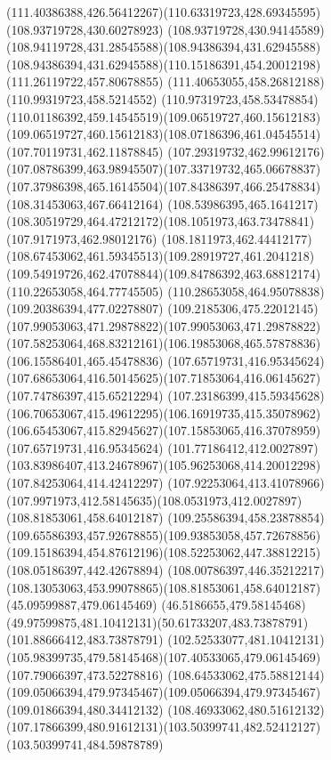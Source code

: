 {{\curveto(111.40386388,426.56412267)(110.63319723,428.69345595)(108.93719728,430.60278923)
\curveto(108.93719728,430.94145589)(108.94119728,431.28545588)(108.94386394,431.62945588)
\curveto(108.94386394,431.62945588)(110.15186391,454.20012198)(111.26119722,457.80678855)
\lineto(111.40653055,458.26812188)
\lineto(110.99319723,458.5214552)
\curveto(110.97319723,458.53478854)(110.01186392,459.14545519)(109.06519727,460.15612183)
\curveto(109.06519727,460.15612183)(108.07186396,461.04545514)(107.70119731,462.11878845)
\curveto(107.29319732,462.99612176)(107.08786399,463.98945507)(107.33719732,465.06678837)
\curveto(107.37986398,465.16145504)(107.84386397,466.25478834)(108.31453063,467.66412164)
\lineto(108.53986395,465.1641217)
\curveto(108.30519729,464.47212172)(108.1051973,463.73478841)(107.9171973,462.98012176)
\curveto(108.1811973,462.44412177)(108.67453062,461.59345513)(109.28919727,461.2041218)
\curveto(109.54919726,462.47078844)(109.84786392,463.68812174)(110.22653058,464.77745505)
\lineto(110.28653058,464.95078838)
\lineto(109.20386394,477.02278807)
\curveto(109.2185306,475.22012145)(107.99053063,471.29878822)(107.99053063,471.29878822)
\curveto(107.58253064,468.83212161)(106.19853068,465.57878836)(106.15586401,465.45478836)
\moveto(107.65719731,416.95345624)
\curveto(107.68653064,416.50145625)(107.71853064,416.06145627)(107.74786397,415.65212294)
\curveto(107.23186399,415.59345628)(106.70653067,415.49612295)(106.16919735,415.35078962)
\curveto(106.65453067,415.82945627)(107.15853065,416.37078959)(107.65719731,416.95345624)
\moveto(101.77186412,412.0027897)
\curveto(103.83986407,413.24678967)(105.96253068,414.20012298)(107.84253064,414.42412297)
\curveto(107.92253064,413.41078966)(107.9971973,412.58145635)(108.0531973,412.0027897)
\closepath
\moveto(108.81853061,458.64012187)
\curveto(109.25586394,458.23878854)(109.65586393,457.92678855)(109.93853058,457.72678856)
\curveto(109.15186394,454.87612196)(108.52253062,447.38812215)(108.05186397,442.42678894)
\curveto(108.00786397,446.35212217)(108.13053063,453.99078865)(108.81853061,458.64012187)
\moveto(45.09599887,479.06145469)
\curveto(46.5186655,479.58145468)(49.97599875,481.10412131)(50.61733207,483.73878791)
\lineto(101.88666412,483.73878791)
\curveto(102.52533077,481.10412131)(105.98399735,479.58145468)(107.40533065,479.06145469)
\lineto(107.79066397,473.52278816)
\curveto(108.64533062,475.58812144)(109.05066394,479.97345467)(109.05066394,479.97345467)
\lineto(109.01866394,480.34412132)
\lineto(108.46933062,480.51612132)
\curveto(107.17866399,480.91612131)(103.50399741,482.52412127)(103.50399741,484.59878789)
}}

